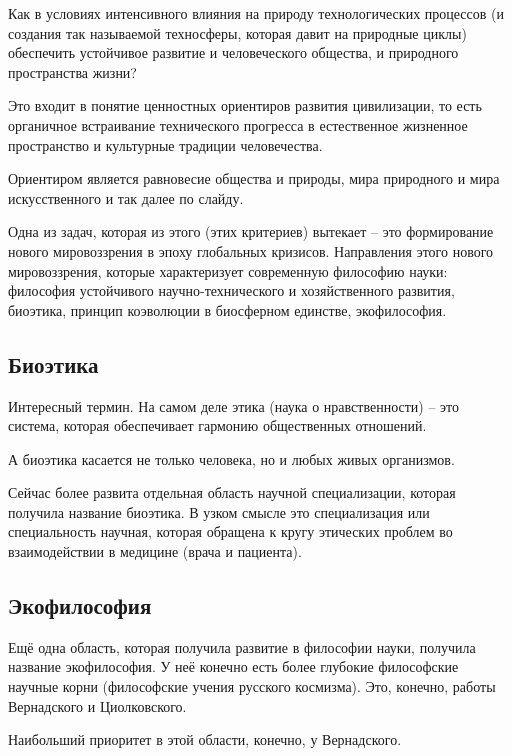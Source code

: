 \documentclass[main.tex]{subfiles}
\begin{document}

Как в условиях интенсивного влияния на природу технологических процессов (и создания так называемой техносферы, которая давит на природные циклы) обеспечить устойчивое развитие и человеческого общества, и природного пространства жизни?

Это входит в понятие ценностных ориентиров развития цивилизации, то есть органичное встраивание технического прогресса в естественное жизненное пространство и культурные традиции человечества.

Ориентиром является равновесие общества и природы, мира природного и мира искусственного и так далее по слайду.

Одна из задач, которая из этого (этих критериев) вытекает -- это формирование нового мировоззрения в эпоху глобальных кризисов.
Направления этого нового мировоззрения, которые характеризует современную философию науки: философия устойчивого научно-технического и хозяйственного развития, биоэтика, принцип коэволюции в биосферном единстве, экофилософия.

\subsection{Биоэтика}


Интересный термин.
На самом деле этика (наука о нравственности) -- это система, которая обеспечивает гармонию общественных отношений.

А биоэтика касается не только человека, но и любых живых организмов.

Сейчас более развита отдельная область научной специализации, которая получила название биоэтика.
В узком смысле это специализация или специальность научная, которая обращена к кругу этических проблем во взаимодействии в медицине (врача и пациента).

\subsection{Экофилософия}


Ещё одна область, которая получила развитие в философии науки, получила название экофилософия.
У неё конечно есть более глубокие философские научные корни (философские учения русского космизма).
Это, конечно, работы Вернадского и Циолковского.

Наибольший приоритет в этой области, конечно, у Вернадского.
\end{document}
